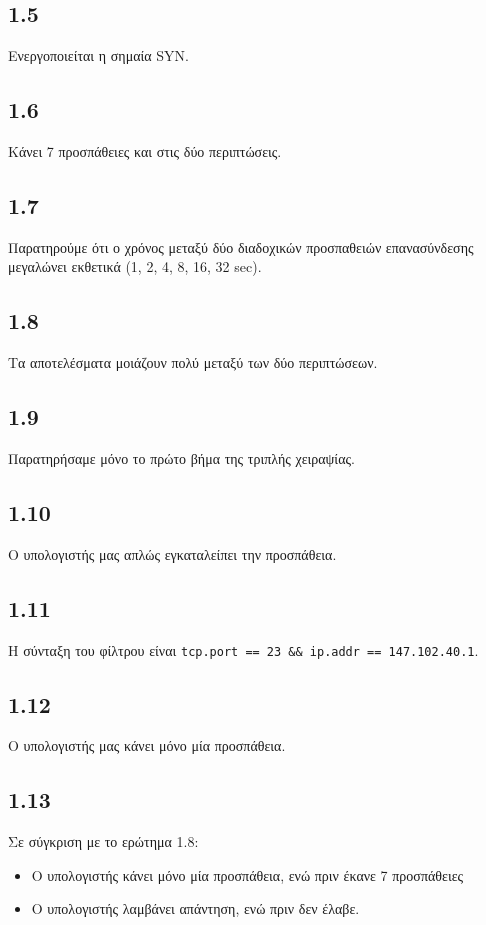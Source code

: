 		\subsection*{1.5} 
			Ενεργοποιείται η σημαία SYN.
		
		\subsection*{1.6} 
			Κάνει 7 προσπάθειες και στις δύο περιπτώσεις.
		
		\subsection*{1.7} 
			Παρατηρούμε ότι ο χρόνος μεταξύ δύο διαδοχικών προσπαθειών επανασύνδεσης μεγαλώνει εκθετικά (1, 2, 4, 8, 16, 32 sec).
		
		\subsection*{1.8} 
			Τα αποτελέσματα μοιάζουν πολύ μεταξύ των δύο περιπτώσεων.
		
		\subsection*{1.9} 
			Παρατηρήσαμε μόνο το πρώτο βήμα της τριπλής χειραψίας.
		
		\subsection*{1.10} 
			Ο υπολογιστής μας απλώς εγκαταλείπει την προσπάθεια.
		
		\subsection*{1.11} 
			Η σύνταξη του φίλτρου είναι \verb|tcp.port == 23 && ip.addr == 147.102.40.1|.
		
		\subsection*{1.12} 
			Ο υπολογιστής μας κάνει μόνο μία προσπάθεια.
		
		\subsection*{1.13}
			Σε σύγκριση με το ερώτημα 1.8:
			\begin{itemize}
				\item Ο υπολογιστής κάνει μόνο μία προσπάθεια, ενώ πριν έκανε 7 προσπάθειες
				\item Ο υπολογιστής λαμβάνει απάντηση, ενώ πριν δεν έλαβε.
			\end{itemize}
		
